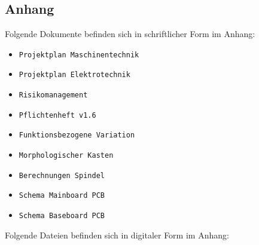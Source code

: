 \newpage
\begin{appendix}
\section{Anhang}
Folgende Dokumente befinden sich in schriftlicher Form im Anhang:

\begin{itemize}
	\item \verb|Projektplan Maschinentechnik|
	\item \verb|Projektplan Elektrotechnik|	
	\item \verb|Risikomanagement|
	\item \verb|Pflichtenheft v1.6|	
	\item \verb|Funktionsbezogene Variation|
	\item \verb|Morphologischer Kasten|	
	\item \verb|Berechnungen Spindel|
	\item \verb|Schema Mainboard PCB|
	\item \verb|Schema Baseboard PCB|	
\end{itemize}

Folgende Dateien befinden sich in digitaler Form im Anhang:


\end{appendix}
